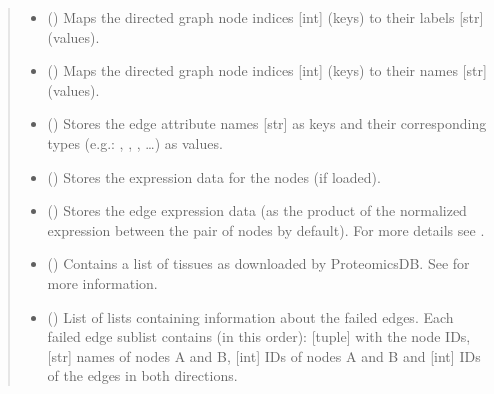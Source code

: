 \documentclass[letterpaper,10pt,english]{sphinxmanual}
\begin{document}
\begin{fulllineitems}
\begin{quote}
\begin{description}
\begin{itemize}
\item {} 
 () \textendash{} Maps the directed graph node indices {[}int{]} (keys) to their
labels {[}str{]} (values).

\item {} 
 () \textendash{} Maps the directed graph node indices {[}int{]} (keys) to their names
{[}str{]} (values).

\item {} 
 () \textendash{} Stores the edge attribute names {[}str{]} as keys and their
corresponding types (e.g.: , , , …) as
values.

\item {} 
 () \textendash{} Stores the expression data for the nodes (if loaded).

\item {} 
 () \textendash{} Stores the edge expression data (as the product of the
normalized expression between the pair of nodes by default). For
more details see {\hyperref[\detokenize{main:pypath.main.PyPath.edges_expression}]{}}.

\item {} 
 () \textendash{} Contains a list of tissues as downloaded by ProteomicsDB. See
{\hyperref[\detokenize{main:pypath.main.PyPath.get_proteomicsdb}]{}} for more information.

\item {} 
 () \textendash{} List of lists containing information about the failed edges.
Each failed edge sublist contains (in this order): {[}tuple{]} with
the node IDs, {[}str{]} names of nodes A and B, {[}int{]} IDs of nodes
A and B and {[}int{]} IDs of the edges in both directions.


\end{itemize}
\end{description}
\end{quote}
\end{fulllineitems}
\end{document}
